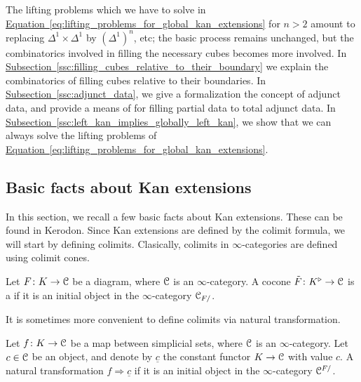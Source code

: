 \documentclass[main.tex]{subfiles}
\begin{document}
The lifting problems which we have to solve in \hyperref[eq:lifting_problems_for_global_kan_extensions]{Equation~\ref*{eq:lifting_problems_for_global_kan_extensions}} for $n > 2$ amount to replacing $\Delta^{1} \times \Delta^{1}$ by $(\Delta^{1})^{n}$, etc; the basic process remains unchanged, but the combinatorics involved in filling the necessary cubes becomes more involved. In \hyperref[ssc:filling_cubes_relative_to_their_boundary]{Subsection~\ref*{ssc:filling_cubes_relative_to_their_boundary}} we explain the combinatorics of filling cubes relative to their boundaries. In \hyperref[ssc:adjunct_data]{Subsection~\ref*{ssc:adjunct_data}}, we give a formalization the concept of adjunct data, and provide a means of for filling partial data to total adjunct data. In \hyperref[ssc:left_kan_implies_globally_left_kan]{Subsection~\ref*{ssc:left_kan_implies_globally_left_kan}}, we show that we can always solve the lifting problems of \hyperref[eq:lifting_problems_for_global_kan_extensions]{Equation~\ref*{eq:lifting_problems_for_global_kan_extensions}}.

\subsection{Basic facts about Kan extensions}
\label{ssc:basic_facts_about_kan_extensions}

In this section, we recall a few basic facts about Kan extensions. These can be found in Kerodon. Since Kan extensions are defined by the colimit formula, we will start by defining colimits. Clasically, colimits in $\infty$-categories are defined using colimit cones.

\begin{definition}
  \label{def:colimit_via_cocones}
  Let $F\colon K \to \mathcal{C}$ be a diagram, where $\mathcal{C}$ is an $\infty$-category. A cocone $\tilde{F}\colon K^{\triangleright} \to \mathcal{C}$ is a  if it is an initial object in the $\infty$-category $\mathcal{C}_{F/}$.
\end{definition}

It is sometimes more convenient to define colimits via natural transformation.

\begin{definition}
  Let $f\colon K \to \mathcal{C}$ be a map between simplicial sets, where $\mathcal{C}$ is an $\infty$-category. Let $c \in \mathcal{C}$ be an object, and denote by $\underline{c}$ the constant functor $K \to \mathcal{C}$ with value $c$. A natural transformation $f \Rightarrow \underline{c}$  if it is an initial object in the $\infty$-category $\mathcal{C}^{F/}$.
\end{definition}
\end{document}
